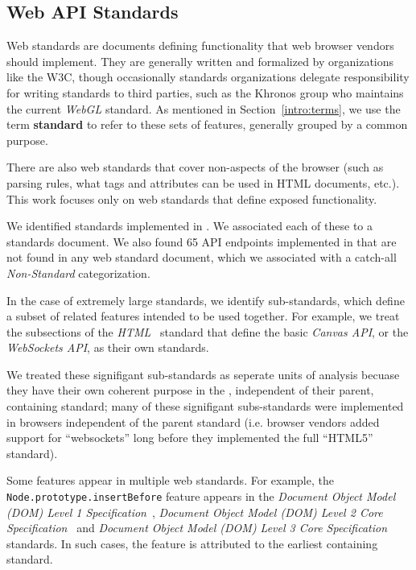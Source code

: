 \subsection{Web API Standards}
Web standards are documents defining functionality that web browser vendors
should implement.  They are generally written and formalized by organizations
like the W3C, though occasionally standards organizations delegate
responsibility for writing standards to third parties, such as the Khronos
group who maintains the current \textit{WebGL} standard.  As mentioned in
Section~\ref{intro:terms}, we use the term \textbf{standard} to refer to these
sets of features, generally grouped by a common purpose.

There are also web standards that cover non-\JS aspects of the browser (such
as parsing rules, what tags and attributes can be used in HTML documents,
etc.). This work focuses only on web standards that define \JS exposed
functionality.

We identified \numstandards standards implemented in \FF.  We associated each
of these to a standards document.  We also found 65 API endpoints implemented
in \FF that are not found in any web standard document, which we associated
with a catch-all \textit{Non-Standard} categorization.

In the case of extremely large standards, we identify sub-standards, which
define a subset of related features intended to be used together.  For example,
we treat the subsections of the \textit{HTML}~\cite{whatwg2018html} standard
that define the basic \textit{Canvas API}, or the \textit{WebSockets API}, as
their own standards.

We treated these signifigant sub-standards as seperate units of analysis
becuase they have their own coherent purpose in the \WAPI, independent
of their parent, containing standard; many of these signifigant subs-standards
were implemented in browsers independent of the parent standard (i.e. browser
vendors added support for ``websockets'' long before they implemented the full
``HTML5'' standard).

Some features appear in multiple web standards.  For example, the
\texttt{Node.prototype.insertBefore} feature appears in the \textit{Document
Object Model (DOM) Level 1 Specification}~\cite{dom1w3c}, \textit{Document
Object Model (DOM) Level 2 Core Specification}~\cite{dom2corew3c} and
\emph{Document Object Model (DOM) Level 3 Core
Specification}~\cite{dom3corew3c} standards.  In such cases, the feature is
attributed to the earliest containing standard.



